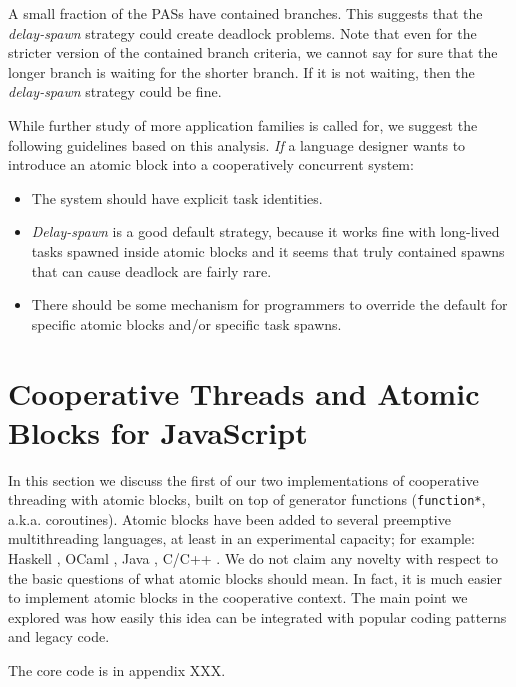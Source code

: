 \documentclass[acmsmall,anonymous,review]{acmart}\settopmatter{printfolios=true,printccs=false,printacmref=false}
\begin{document}
A small fraction of the PASs have contained branches.
This suggests that the \emph{delay-spawn} strategy could create deadlock problems.
Note that even for the stricter version of the contained branch criteria, we cannot say for sure that the longer branch is waiting for the shorter branch.
If it is not waiting, then the \emph{delay-spawn} strategy could be fine.


While further study of more application families is called for, we suggest the following guidelines based on this analysis.
\emph{If} a language designer wants to introduce an atomic block into a cooperatively concurrent system:
\begin{itemize}
\item The system should have explicit task identities.
\item \emph{Delay-spawn} is a good default strategy, because it works fine with long-lived tasks spawned inside atomic blocks and it seems that truly contained spawns that can cause deadlock are fairly rare.
\item There should be some mechanism for programmers to override the default for specific atomic blocks and/or specific task spawns.
\end{itemize}

\section{Cooperative Threads and Atomic Blocks for JavaScript}

In this section we discuss the first of our two implementations of cooperative threading with atomic blocks, built on top of generator functions (\texttt{function*}, a.k.a. coroutines).
Atomic blocks have been added to several preemptive multithreading languages, at least in an experimental capacity; for example: Haskell \cite{Harris2005}, OCaml \cite{Ringenburg2005}, Java \cite{Herlihy2006}, C/C++ \cite{Ni2008}.
We do not claim any novelty with respect to the basic questions of what atomic blocks should mean.
In fact, it is much easier to implement atomic blocks in the cooperative context.
The main point we explored was how easily this idea can be integrated with popular coding patterns and legacy code.

The core code is in appendix XXX.
\end{document}
